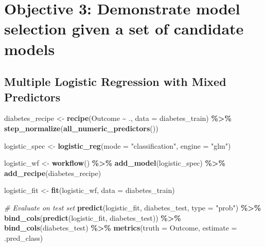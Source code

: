 \documentclass[
]{article}
\newenvironment{Shaded}{\begin{snugshade}}{\end{snugshade}}
\newcommand{\AttributeTok}[1]{\textcolor[rgb]{0.13,0.29,0.53}{#1}}
\newcommand{\CommentTok}[1]{\textcolor[rgb]{0.56,0.35,0.01}{\textit{#1}}}
\newcommand{\FunctionTok}[1]{\textcolor[rgb]{0.13,0.29,0.53}{\textbf{#1}}}
\newcommand{\NormalTok}[1]{#1}
\newcommand{\OtherTok}[1]{\textcolor[rgb]{0.56,0.35,0.01}{#1}}
\newcommand{\SpecialCharTok}[1]{\textcolor[rgb]{0.81,0.36,0.00}{\textbf{#1}}}
\newcommand{\StringTok}[1]{\textcolor[rgb]{0.31,0.60,0.02}{#1}}
\begin{document}
\section{Objective 3: Demonstrate model selection given a set of
candidate
models}\label{objective-3-demonstrate-model-selection-given-a-set-of-candidate-models}

\subsection{Multiple Logistic Regression with Mixed
Predictors}\label{multiple-logistic-regression-with-mixed-predictors}

\begin{Shaded}
\begin{Highlighting}[]
\NormalTok{diabetes\_recipe }\OtherTok{\textless{}{-}} \FunctionTok{recipe}\NormalTok{(Outcome }\SpecialCharTok{\textasciitilde{}}\NormalTok{ ., }\AttributeTok{data =}\NormalTok{ diabetes\_train) }\SpecialCharTok{\%\textgreater{}\%}
  \FunctionTok{step\_normalize}\NormalTok{(}\FunctionTok{all\_numeric\_predictors}\NormalTok{())}

\NormalTok{logistic\_spec }\OtherTok{\textless{}{-}} \FunctionTok{logistic\_reg}\NormalTok{(}\AttributeTok{mode =} \StringTok{"classification"}\NormalTok{, }\AttributeTok{engine =} \StringTok{"glm"}\NormalTok{)}

\NormalTok{logistic\_wf }\OtherTok{\textless{}{-}} \FunctionTok{workflow}\NormalTok{() }\SpecialCharTok{\%\textgreater{}\%}
  \FunctionTok{add\_model}\NormalTok{(logistic\_spec) }\SpecialCharTok{\%\textgreater{}\%}
  \FunctionTok{add\_recipe}\NormalTok{(diabetes\_recipe)}

\NormalTok{logistic\_fit }\OtherTok{\textless{}{-}} \FunctionTok{fit}\NormalTok{(logistic\_wf, }\AttributeTok{data =}\NormalTok{ diabetes\_train)}

\CommentTok{\# Evaluate on test set}
\FunctionTok{predict}\NormalTok{(logistic\_fit, diabetes\_test, }\AttributeTok{type =} \StringTok{"prob"}\NormalTok{) }\SpecialCharTok{\%\textgreater{}\%}
  \FunctionTok{bind\_cols}\NormalTok{(}\FunctionTok{predict}\NormalTok{(logistic\_fit, diabetes\_test)) }\SpecialCharTok{\%\textgreater{}\%}
  \FunctionTok{bind\_cols}\NormalTok{(diabetes\_test) }\SpecialCharTok{\%\textgreater{}\%}
  \FunctionTok{metrics}\NormalTok{(}\AttributeTok{truth =}\NormalTok{ Outcome, }\AttributeTok{estimate =}\NormalTok{ .pred\_class)}
\end{Highlighting}
\end{Shaded}
\end{document}
